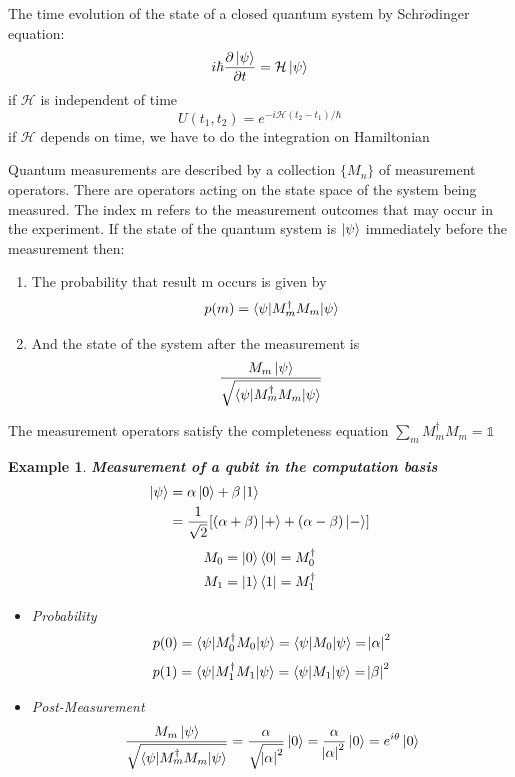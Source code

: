 \documentclass[]{article}
\newtheorem*{example}{Example}
\theoremstyle{nonumberplain}
\begin{document}
\begin{postu}
	The time evolution of the state of a closed quantum system by Schr$\ddot{o}$dinger equation:
\[
i\hbar\frac{\partial \ket{\psi}}{\partial t} = \mathcal{H}\ket{\psi}
\] 
if $\mathcal{H}$ is independent of time
\[
	U(t_{1},t_{2}) = e^{-i\mathcal{H}(t_{2}-t_{1})/\hbar}
\] 
if $\mathcal{H}$ depends on time, we have to do the integration on Hamiltonian
\end{postu}
\begin{postu}
	Quantum measurements are described by a collection $\{M_{n}\}$ of measurement operators. There are operators acting on the state space of the system being measured. The index m refers to the measurement outcomes that may occur in the experiment. If the state of the quantum system is $\ket{\psi}$ immediately before the measurement then:
\begin{enumerate}
	\item The probability that result m occurs is given by 
		\[
			p(m) = \braket{\psi|M_{m}^{\dagger}M_{m}|\psi}
		\] 
	\item And the state of the system after the measurement is 
		\[
			\frac{M_{m}\ket{\psi}}{\sqrt{\braket{\psi|M_{m}^{\dagger}M_{m}|\psi}}}
		\] 
\end{enumerate}
The measurement operators satisfy the completeness equation $\sum^{}_{m} M^{\dagger}_{m}M_{m}=\mathds{1}$ 
\end{postu}
\begin{example}
\textbf{Measurement of a qubit in the computation basis}
\begin{equation*}
\begin{aligned}
	\ket{\psi} &= \alpha\ket{0}+\beta\ket{1}\\
				  &=	\frac{1}{\sqrt{2}}[(\alpha+\beta)\ket{+}+(\alpha-\beta)\ket{-}] \\
\end{aligned}
\end{equation*}
\begin{equation*}
\begin{aligned}
	M_{0} &= \ket{0}\bra{0}=M_{0}^{\dagger} \\
	M_{1} &= \ket{1}\bra{1}=M_{1}^{\dagger}
\end{aligned}
\end{equation*}
\begin{itemize}
	\item Probability
		\[
			p(0) = \braket{\psi|M_{0}^{\dagger}M_{0}|\psi} = \braket{\psi|M_{0}|\psi} = \abs{\alpha}^{2}
		\] 
		\[
			p(1) = \braket{\psi|M_{1}^{\dagger}M_{1}|\psi} = \braket{\psi|M_{1}|\psi} = \abs{\beta}^{2}
		\] 
	\item Post-Measurement
\[
	\frac{M_{m}\ket{\psi}}{\sqrt{\braket{\psi|M_{m}^{\dagger}M_{m}|\psi}}}=\frac{\alpha}{\sqrt{\abs{\alpha}^{2}}}\ket{0}=\frac{\alpha}{\abs{\alpha}^{2}}\ket{0}=e^{i\theta}\ket{0}
\] 
\end{itemize}
\end{example}
\end{document}
